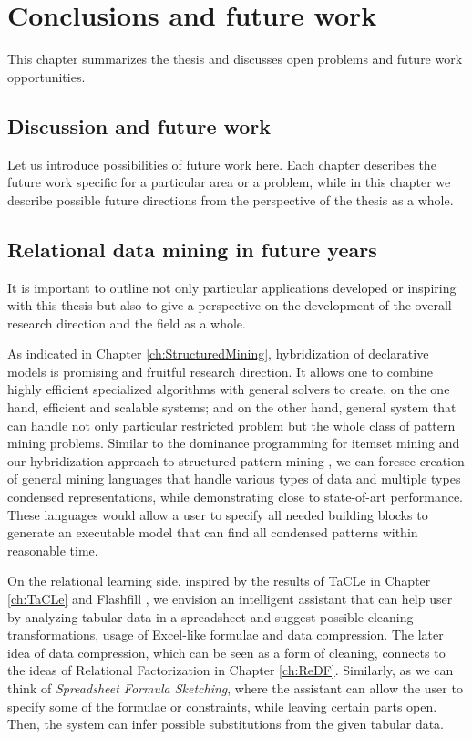 \chapter{Conclusions and future work}\label{ch:conclusions}
\begin{addmargin}[2em]{2em}
This chapter summarizes the thesis and discusses open problems and
future work opportunities.
\end{addmargin}

\section{Discussion and future work}
Let us introduce possibilities of future work here. Each chapter
describes the future work specific for a particular area or a problem,
while in this chapter we describe possible future directions from the
perspective of the thesis as a whole.



\section{Relational data mining in future years}
It is important to outline not only particular applications developed
or inspiring with this thesis but also to give a perspective on the
development of the overall research direction and the field as a
whole.

As indicated in Chapter \ref{ch:StructuredMining}, hybridization of
declarative models is promising and fruitful research direction. It
allows one to combine highly efficient specialized algorithms with
general solvers to create, on the one hand, efficient and scalable
systems; and on the other hand, general system that can handle not
only particular restricted problem but the whole class of pattern
mining problems. Similar to the dominance programming for itemset
mining \parencite{dominanceprogramming} and our hybridization approach
to structured pattern mining \parencite{ruleml_hybrid}, we can foresee creation of 
general mining languages that handle various types of data and
multiple types condensed representations, while demonstrating close to
state-of-art performance. These languages would allow a user to
specify all needed building blocks to generate an executable model
that can find all condensed patterns within reasonable time.

On the relational learning side, inspired by the results of TaCLe
\parencite{tacle} in Chapter \ref{ch:TaCLe} and Flashfill \parencite{flashfill}, we envision an intelligent
assistant that can help user by analyzing tabular data in a
spreadsheet and suggest possible cleaning transformations, usage of
Excel-like formulae and data compression. The later idea of data
compression, which can be seen as a form of cleaning, connects to the
ideas of Relational Factorization in Chapter \ref{ch:ReDF}.
Similarly, as we can think of \textit{Spreadsheet Formula Sketching}, where the assistant can allow the user to specify some of the
formulae or constraints, while leaving certain parts open. Then, the
system can infer possible substitutions from the given tabular data.

